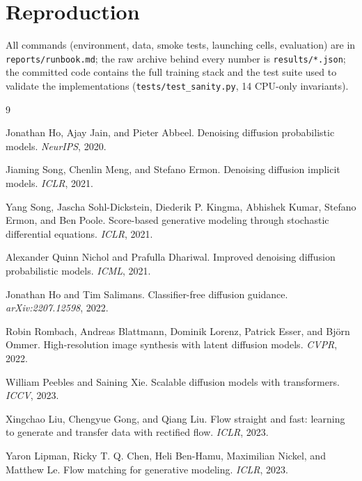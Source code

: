 \documentclass{article}
\begin{document}
\section*{Reproduction}

All commands (environment, data, smoke tests, launching cells, evaluation) are in
\texttt{reports/runbook.md}; the raw archive behind every number is \texttt{results/*.json};
the committed code contains the full training stack and the test suite used to validate the
implementations (\texttt{tests/test\_sanity.py}, 14 CPU-only invariants).

\begin{thebibliography}{9}

Jonathan Ho, Ajay Jain, and Pieter Abbeel.
\newblock Denoising diffusion probabilistic models.
\newblock \emph{NeurIPS}, 2020.

Jiaming Song, Chenlin Meng, and Stefano Ermon.
\newblock Denoising diffusion implicit models.
\newblock \emph{ICLR}, 2021.

Yang Song, Jascha Sohl-Dickstein, Diederik P. Kingma, Abhishek Kumar, Stefano Ermon, and
Ben Poole.
\newblock Score-based generative modeling through stochastic differential equations.
\newblock \emph{ICLR}, 2021.

Alexander Quinn Nichol and Prafulla Dhariwal.
\newblock Improved denoising diffusion probabilistic models.
\newblock \emph{ICML}, 2021.

Jonathan Ho and Tim Salimans.
\newblock Classifier-free diffusion guidance.
\newblock \emph{arXiv:2207.12598}, 2022.

Robin Rombach, Andreas Blattmann, Dominik Lorenz, Patrick Esser, and Bj\"orn Ommer.
\newblock High-resolution image synthesis with latent diffusion models.
\newblock \emph{CVPR}, 2022.

William Peebles and Saining Xie.
\newblock Scalable diffusion models with transformers.
\newblock \emph{ICCV}, 2023.

Xingchao Liu, Chengyue Gong, and Qiang Liu.
\newblock Flow straight and fast: learning to generate and transfer data with rectified
flow.
\newblock \emph{ICLR}, 2023.

Yaron Lipman, Ricky T. Q. Chen, Heli Ben-Hamu, Maximilian Nickel, and Matthew Le.
\newblock Flow matching for generative modeling.
\newblock \emph{ICLR}, 2023.


\end{thebibliography}
\end{document}
